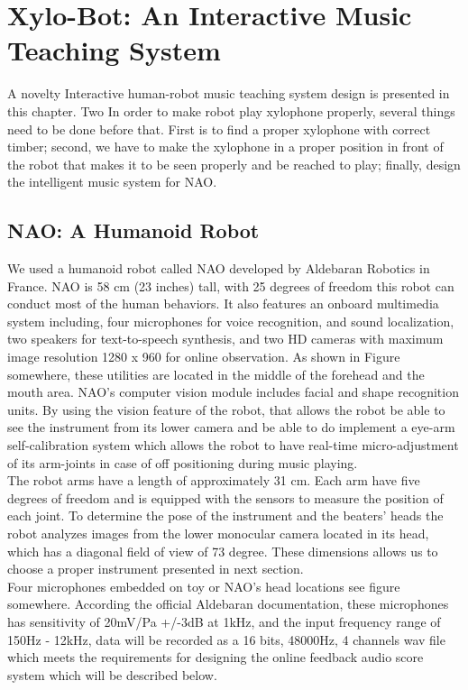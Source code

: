 \chapter{Xylo-Bot: An Interactive Music Teaching System} 
A novelty Interactive human-robot music teaching system design is presented in 
this chapter. Two In order to make robot play xylophone properly, several things need 
to be done before that. First is to find a proper xylophone with correct timber; 
second, we have to make the xylophone in a proper position in front of the robot 
that makes it to be seen properly and be reached to play; finally, design the 
intelligent music system for NAO.\\

\section{NAO: A Humanoid Robot}
We used a humanoid  robot called NAO developed by Aldebaran Robotics in France. 
NAO is 58 cm (23 inches) tall, with 25 degrees of freedom this robot 
can conduct most of the human behaviors. It also features an onboard multimedia 
system including, four microphones for voice recognition, and sound localization, 
two speakers for text-to-speech synthesis, and two HD cameras with maximum image 
resolution 1280 x 960 for online observation. As shown in Figure somewhere, these 
utilities are located in the middle of the forehead and the mouth area. NAO’s 
computer vision module includes facial and shape recognition units. By using the 
vision feature of the robot, that allows the robot be able to see the instrument 
from its lower camera and be able to do implement a eye-arm self-calibration 
system which allows the robot to have real-time micro-adjustment of its 
arm-joints in case of off positioning during music playing.\\
The robot arms have a length of approximately 31 cm. Each arm have five degrees 
of freedom and is equipped with the sensors to measure the position of each 
joint. To determine the pose of the instrument and the beaters' heads the robot 
analyzes images from the lower monocular camera located in its head, which has a 
diagonal field of view of 73 degree. These dimensions allows us to choose a 
proper instrument presented in next section.\\
Four microphones embedded on toy or NAO's head locations see figure somewhere. 
According the official Aldebaran documentation, these microphones has sensitivity 
of 20mV/Pa +/-3dB at 1kHz, and the input frequency range of 150Hz - 12kHz, data 
will be recorded as a 16 bits, 48000Hz, 4 channels wav file which meets the 
requirements for designing the online feedback audio score system which will be 
described below.\\

